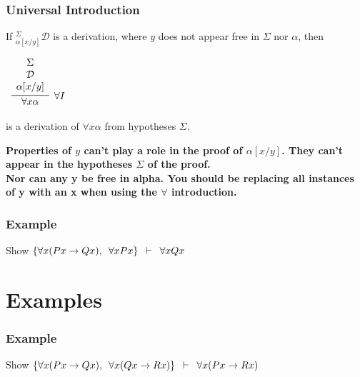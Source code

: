 \documentclass{beamer}
\theoremstyle{indentDefn} \newtheorem{defn}[]{Definition}
\begin{document}
\begin{frame}
	\frametitle{Universal Introduction}
	
	If $^{\Sigma}_{\alpha[x/y]}\mathcal{D}$ is a derivation, where $y$ does not appear free in $\Sigma$ nor $\alpha$, then
	
	\vspace{0.5cm}
	
	\begin{center}
		$\begin{array}{c}
		\infer[\forall I]{\forall x \alpha}{\begin{array}{c} 
			\Sigma \\
			\mathcal{D} \\ 
			\alpha[x/y]
			\end{array}}
		\end{array}$
	\end{center}
	
	is a derivation of $\forall x \alpha$ from hypotheses $\Sigma$. 
	
	\vspace{0.5cm} 
	
	{\bf Properties of $y$ can't play a role in the proof of $\alpha[x/y]$. They can't appear in the hypotheses $\Sigma$ of the proof.} \\
	
	{\bf Nor can any y be free in alpha. You should be replacing all instances of y with an x when using the $\forall$ introduction.}
	
\end{frame}

\begin{frame}
	\frametitle{Example}
	
	Show $\{\forall x (Px \rightarrow Qx), \hspace{0.5em} \forall x Px\} \hspace{0.5em} \vdash \hspace{0.5em} \forall x Qx$
	
	\vspace{7cm}
	
\end{frame}

\section{Examples}

\begin{frame}
	\frametitle{Example}
	
	Show $\{\forall x (Px \rightarrow Qx), \hspace{0.5em} \forall x (Qx \rightarrow Rx)\} \hspace{0.5em} \vdash \hspace{0.5em} \forall x (Px \rightarrow Rx)$
	
	
	\vspace{7cm}
	
\end{frame}
\end{document}

